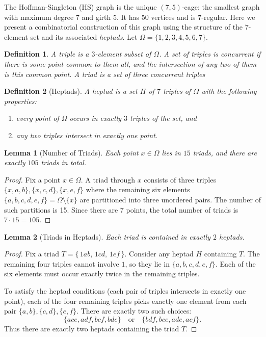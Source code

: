 \documentclass[12pt,a4paper,openany]{book}
\newtheorem{definition}{Definition}[section]
\newtheorem{lemma}{Lemma}[section]
\begin{document}
The Hoffman-Singleton (HS) graph is the unique $(7,5)$-cage: the smallest graph with maximum degree $7$ and girth $5$. It has $50$ vertices and is $7$-regular. Here we  present a combinatorial construction of this graph using the structure of the $7$-element set and its associated \emph{heptads}. Let $\Omega = \{1, 2, 3, 4, 5, 6, 7\}$.

\begin{definition}
A \emph{triple} is a $3$-element subset of $\Omega$.  A set of triples is \emph{concurrent} if there is some point common to them all, and the intersection of any two of them is this common point. A \emph{triad} is a set of three concurrent triples
\end{definition}

\begin{definition}[Heptads]
A \emph{heptad} is a set $H$ of $7$ triples of $\Omega$ with the following properties:
\begin{enumerate}[label=(\roman*)]
    
  \item every point of $\Omega$ occurs in exactly $3$ triples of the set, and
  \item any two triples intersect in exactly one point.

\end{enumerate}

\end{definition}


\begin{lemma}[Number of Triads]\label{lem:num-triads}
Each point $x \in \Omega$ lies in $15$ triads, and there are exactly $105$ triads in total.
\end{lemma}

\begin{proof}
Fix a point $x \in \Omega$. A triad through $x$ consists of three triples 
$\{x,a,b\}, \{x,c,d\}, \{x,e,f\}$ where the remaining six elements 
$\{a,b,c,d,e,f\} = \Omega \setminus \{x\}$ are partitioned into three unordered pairs.  
The number of such partitions is 15.
Since there are 7 points, the total number of triads is $7 \cdot 15 = 105$.
\end{proof}

\begin{lemma}[Triads in Heptads]\label{lem:triads-in-heptads}
Each triad is contained in exactly $2$ heptads.
\end{lemma}

\begin{proof}
Fix a triad $T = \{\,1ab,\,1cd,\,1ef\,\}$. Consider any heptad $H$ containing $T$.  
The remaining four triples cannot involve $1$, so they lie in $\{a,b,c,d,e,f\}$.  
Each of the six elements must occur exactly twice in the remaining triples.  

To satisfy the heptad conditions (each pair of triples intersects in exactly one point), each of the four remaining triples picks exactly one element from each pair $\{a,b\},\{c,d\},\{e,f\}$. There are exactly two such choices:
\[
\{ace, adf, bcf, bde\} \quad\text{or}\quad \{bdf, bce, ade, acf\}.
\]
Thus there are exactly two heptads containing the triad $T$.
\end{proof}
\end{document}
